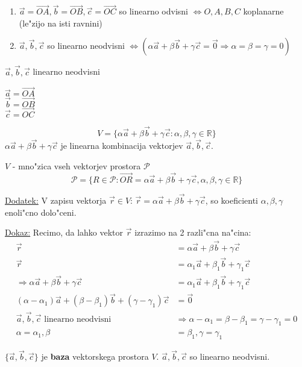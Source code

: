 \begin{enumerate}
	\item \(\vec{a} = \vec{OA}, \vec{b} = \vec{OB}, \vec{c} = \vec{OC}\) so linearno odvisni \(\Leftrightarrow O, A, B, C\) koplanarne (le"zijo na isti ravnini)
	\item \(\vec{a}, \vec{b}, \vec{c}\) so linearno neodvisni \(\Leftrightarrow (\alpha \vec{a} + \beta \vec{b} + \gamma \vec{c} = \vec{0} \Rightarrow \alpha = \beta = \gamma = 0)\)
\end{enumerate}

\(\vec{a}, \vec{b}, \vec{c}\) linearno neodvisni

\(\vec{a} = \vec{OA}\)\\
\(\vec{b} = \vec{OB}\)\\
\(\vec{c} = \vec{OC}\)

\[V = \{\alpha \vec{a} + \beta \vec{b} + \gamma \vec{c}: \alpha, \beta, \gamma \in \mathbb{R}\}\]
\(\alpha \vec{a} + \beta \vec{b} + \gamma \vec{c}\) je linearna kombinacija vektorjev \(\vec{a}, \vec{b}, \vec{c}\).

\(V\) - mno"zica vseh vektorjev prostora \(\mathcal{P}\)
\[\mathcal{P} = \{R \in \mathcal{P}: \vec{OR} = \alpha \vec{a} + \beta \vec{b} + \gamma \vec{c}, \alpha, \beta, \gamma \in \mathbb{R}\}\]

\underline{Dodatek:} V zapisu vektorja \(\vec{r} \in V\): \(\vec{r} = \alpha \vec{a} + \beta \vec{b} + \gamma \vec{c}\), so koeficienti \(\alpha, \beta, \gamma\) enoli"cno dolo"ceni.

\underline{Dokaz:}
Recimo, da lahko vektor $\vec{r}$ izrazimo na 2 razli"cna na"cina:
\begin{align*}
	\vec{r} &= \alpha \vec{a} + \beta \vec{b} + \gamma \vec{c}\\
	\vec{r} &= \alpha_1 \vec{a} + \beta_1 \vec{b} + \gamma_1 \vec{c}\\
	\Rightarrow \alpha \vec{a} + \beta \vec{b} + \gamma \vec{c} &= \alpha_1 \vec{a} + \beta_1 \vec{b} + \gamma_1 \vec{c}\\
	(\alpha - \alpha_1)\vec{a} + (\beta - \beta_1)\vec{b} + (\gamma - \gamma_1)\vec{c} &= \vec{0}\\
	\vec{a}, \vec{b}, \vec{c} \text{ linearno neodvisni } &\Rightarrow \alpha - \alpha_1 = \beta - \beta_1 = \gamma - \gamma_1 = 0\\
	\alpha = \alpha_1, \beta &= \beta_1, \gamma = \gamma_1
\end{align*}

\(\{\vec{a}, \vec{b}, \vec{c}\}\) je \textbf{baza} vektorskega prostora \(V\). \(\vec{a}, \vec{b}, \vec{c}\) so linearno neodvisni.

